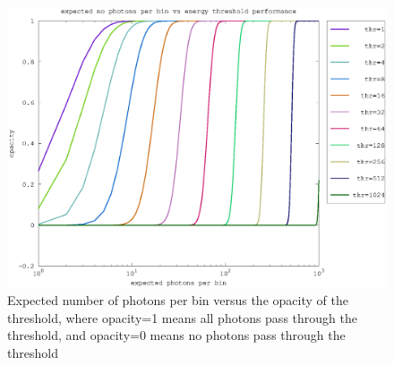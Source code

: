 \begin{figure}[H]
\centering
	\includegraphics[width=0.8\linewidth]{fig/threshold_efficiency.eps}
\caption{Expected number of photons per bin versus the opacity of the threshold, where opacity=1 means all photons pass through the threshold, and opacity=0 means no photons pass through the threshold}
\label{fig:threshold_efficiency}
\end{figure}












